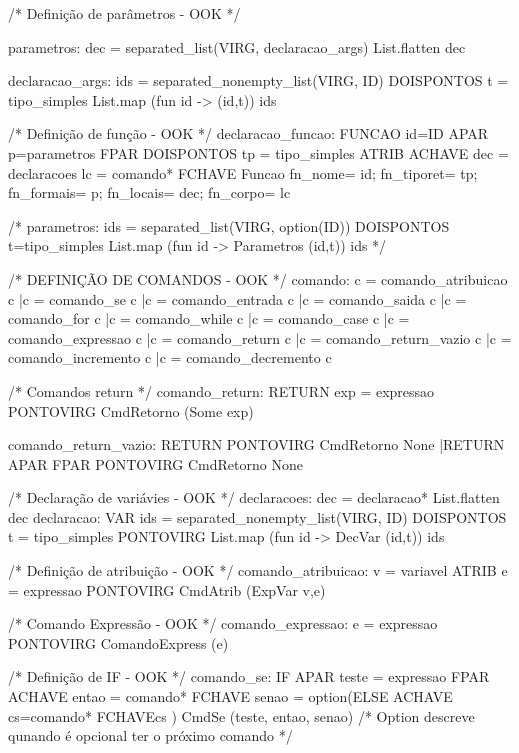 \documentclass[12pt,a4paper,twoside]{article}
\begin{document}
\begin{terminal}
/* Definição de parâmetros 					- OOK */

parametros: dec = separated_list(VIRG, declaracao_args) { List.flatten dec}

declaracao_args: ids = separated_nonempty_list(VIRG, ID)
 DOISPONTOS t = tipo_simples
 {   List.map (fun id -> (id,t)) ids}

/* Definição de função 						- OOK */
declaracao_funcao: 
		FUNCAO id=ID APAR p=parametros FPAR DOISPONTOS tp = tipo_simples ATRIB 
			ACHAVE
				dec = declaracoes
				lc = comando*
			FCHAVE {
          Funcao{
  fn_nome=      id;
  fn_tiporet=   tp;
  fn_formais=   p;
  fn_locais=   dec;
  fn_corpo=   lc
          }
}



/* parametros: ids = separated_list(VIRG, option(ID)) DOISPONTOS t=tipo_simples {List.map (fun id -> Parametros (id,t)) ids } */

/* DEFINIÇÃO DE COMANDOS 					- OOK */
comando: c = comando_atribuicao 		{ c } 
		|c = comando_se 		        { c } 
		|c = comando_entrada 	      	{ c } 
		|c = comando_saida 			    { c } 
		|c = comando_for 	        	{ c } 
		|c = comando_while 				{ c } 
		|c = comando_case			    { c } 
		|c = comando_expressao		    { c }
		|c = comando_return			    { c }
		|c = comando_return_vazio		{ c }
		|c = comando_incremento			{ c }
		|c = comando_decremento			{ c }	

/* Comandos return */
comando_return: RETURN exp = expressao PONTOVIRG		{ CmdRetorno (Some exp)}

comando_return_vazio: RETURN PONTOVIRG					{ CmdRetorno None	}
					 |RETURN APAR FPAR PONTOVIRG		{ CmdRetorno None 	}

/* Declaração de variávies					- OOK */
declaracoes: dec = declaracao* { List.flatten dec}
declaracao: VAR ids = separated_nonempty_list(VIRG, ID) DOISPONTOS t = tipo_simples PONTOVIRG {List.map (fun id -> DecVar (id,t)) ids }

/* Definição de atribuição 					- OOK */
comando_atribuicao: v = variavel ATRIB e = expressao PONTOVIRG {CmdAtrib (ExpVar v,e)}

/* Comando Expressão						- OOK */
comando_expressao: e = expressao PONTOVIRG {  ComandoExpress (e) }


/* Definição de IF		 					- OOK */
comando_se:	IF APAR teste = expressao FPAR ACHAVE
				entao = comando*
			FCHAVE
				senao = option(ELSE ACHAVE cs=comando* FCHAVE{cs} ) {CmdSe (teste, entao, senao)}
			/* Option descreve qunando é opcional ter o próximo comando */


\end{terminal}
\end{document}

